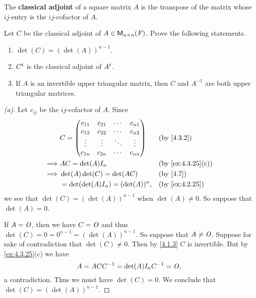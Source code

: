 \begin{defn}\label{4.3.2}
  The \textbf{classical adjoint} of a square matrix \(A\) is the transpose of the matrix whose \(i j\)-entry is the \(i j\)-cofactor of \(A\).
\end{defn}

\setcounter{ex}{26}
\begin{ex}\label{ex:4.3.27}
  Let \(C\) be the classical adjoint of \(A \in \ms[n][n][\F]\).
  Prove the following statements.
  \begin{enumerate}
    \item \(\det(C) = (\det(A))^{n - 1}\).
    \item \({C}^{t}\) is the classical adjoint of \({A}^{t}\).
    \item If \(A\) is an invertible upper triangular matrix, then \(C\) and \(A^{-1}\) are both upper triangular matrices.
  \end{enumerate}
\end{ex}

\begin{proof}[(a)]
  Let \(c_{i j}\) be the \(i j\)-cofactor of \(A\).
  Since
  \begin{align*}
             & C = \begin{pmatrix}
                     c_{1 1} & c_{2 1} & \cdots & c_{n 1} \\
                     c_{1 2} & c_{2 2} & \cdots & c_{n 2} \\
                     \vdots  & \vdots  & \ddots & \vdots  \\
                     c_{1 n} & c_{2 n} & \cdots & c_{n n}
                   \end{pmatrix} &  & \by{4.3.2}                       \\
    \implies & AC = \det(A) I_n                        &  & \by{ex:4.3.25}[c] \\
    \implies & \det(A) \det(C) = \det(AC)              &  & \by{4.7}          \\
             & = \det(\det(A) I_n) = (\det(A))^n,      &  & \by{ex:4.2.25}
  \end{align*}
  we see that \(\det(C) = (\det(A))^{n - 1}\) when \(\det(A) \neq 0\).
  So suppose that \(\det(A) = 0\).

  If \(A = \mathit{O}\), then we have \(C = \mathit{O}\) and thus \(\det(C) = 0 = 0^{n - 1} = (\det(A))^{n - 1}\).
  So suppose that \(A \neq \mathit{O}\).
  Suppose for sake of contradiction that \(\det(C) \neq 0\).
  Then by \cref{4.1.3} \(C\) is invertible.
  But by \cref{ex:4.3.25}(c) we have
  \[
    A = A C C^{-1} = \det(A) I_n C^{-1} = \mathit{O},
  \]
  a contradiction.
  Thus we must have \(\det(C) = 0\).
  We conclude that \(\det(C) = (\det(A))^{n - 1}\).
\end{proof}


